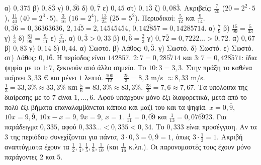  α) $0{,}375$ \quad β) $0{,}8\overline{3}$ \quad γ) $0{,}\overline{36}$ \quad δ) $0{,}\overline{7}$ \quad ε) $0{,}45$ \quad στ) $0{,}1\overline{3}$ \quad ζ) $0{,}08\overline{3}$.
 Ακριβείς: $\frac{7}{20}$ ($20=2^2\cdot5$), $\frac{11}{40}$ ($40=2^3\cdot5$), $\frac{3}{16}$ ($16=2^4$), $\frac{13}{25}$ ($25=5^2$). Περιοδικοί: $\frac{5}{12}$ και $\frac{9}{14}$.
 $0{,}\overline{36}=0{,}36363636$, $2{,}1\overline{45}=2{,}14545454$, $0{,}\overline{142857}=0{,}14285714$.
 α) $\frac{7}{9}$ \quad β) $\frac{15}{99}=\frac{5}{33}$ \quad γ) $\frac{4}{3}$ \quad δ) $\frac{81}{99}=\frac{9}{11}$ \quad ε) $\frac{7}{30}$.
 α) $0{,}\overline{3}>0{,}33$ \quad β) $0{,}\overline{6}=\frac{2}{3}$ \quad γ) $0{,}7\overline{2}=0{,}7222\ldots>0{,}72$.
 α) $0{,}67$ \quad β) $0{,}83$ \quad γ) $0{,}14$ \quad δ) $0{,}44$.
 α) Σωστό. β) Λάθος: $0{,}\overline{3}$. γ) Σωστό. δ) Σωστό. ε) Σωστό. στ) Λάθος: $0{,}1\overline{6}$.
 Η περίοδος είναι $142857$. $2:7=0{,}\overline{285714}$ και $3:7=0{,}\overline{428571}$: ίδια ψηφία με το $1:7$, ξεκινούν από άλλο σημείο.
 Το $10:3=3{,}\overline{3}$. Στην πράξη το καθένα παίρνει $3{,}33$ € και μένει $1$ λεπτό.
 $\frac{100}{12}=\frac{25}{3}=8{,}\overline{3}$ m/s $\approx8{,}33$ m/s.
 $\frac{1}{3}=33{,}\overline{3}\%\approx33{,}3\%$ και $\frac{5}{6}=83{,}\overline{3}\%\approx83{,}3\%$.
 $\frac{23}{3}=7{,}\overline{6}\approx7{,}67$.
 Τα υπόλοιπα της διαίρεσης με το $7$ είναι $1,\dots,6$. Αφού υπάρχουν μόνο έξι διαφορετικά, μετά από το πολύ έξι βήματα επαναλαμβάνεται κάποιο και μαζί του και τα ψηφία.
 $x=0{,}\overline{9}$, $10x=9{,}\overline{9}$, $10x-x=9$, $9x=9$, $x=1$.
 $\frac{1}{11}=0{,}\overline{09}$ και $\frac{1}{13}=0{,}\overline{076923}$.
 Για παράδειγμα $0{,}335$, αφού $0{,}333\ldots<0{,}335<0{,}34$.
 Το $0{,}333$ είναι προσέγγιση. Αν τα $3$ της περιόδου συνεχίζονται για πάντα, $3\cdot0{,}\overline{3}=0{,}\overline{9}=1$, όπως $3\cdot\frac{1}{3}=1$.
 Ακριβή αναπτύγματα έχουν τα $\frac{1}{2},\frac{1}{4},\frac{1}{5},\frac{1}{8},\frac{1}{10}$ (και $\frac{1}{16}$ κ.λπ.). Οι παρονομαστές τους έχουν μόνο παράγοντες $2$ και $5$.
